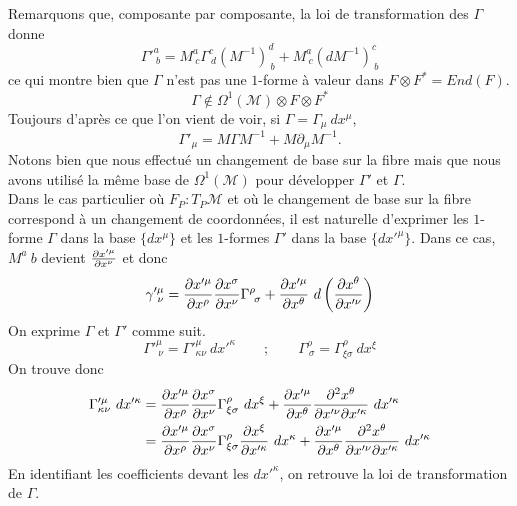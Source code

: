 \documentclass[a4paper,11pt]{report}
\theoremstyle{definition}
\theoremstyle{plain}
\theoremstyle{definition}
\theoremstyle{remark}
\newcommand{\M}{\mathscr{M}}
\newcommand{\p}{\partial}
\begin{document}
            Remarquons que, composante par composante, la loi de transformation des $\Gamma$ donne 
            \begin{equation}
                \Gamma'^{a}_{~b} = M^a_{~c}\Gamma^c_{~d}(M^{-1})^d_{~b}+M^a_{~c}(dM^{-1})^c_{~b}
            \end{equation}
            ce qui montre bien que $\Gamma$ n'est pas une $1$-forme à valeur dans $F\otimes F^* = End(F)$.
            \begin{equation}
                \Gamma\notin \Omega^1(\M)\otimes F \otimes F^*
            \end{equation}
            Toujours d'après ce que l'on vient de voir, si $\Gamma = \Gamma_\mu~dx^\mu$,
            \begin{equation}
                \Gamma'_{\mu} = M\Gamma M^{-1} + M\p_\mu M^{-1}.
            \end{equation}
            Notons bien que nous effectué un changement de base sur la fibre mais que nous avons utilisé la même base de $\Omega^1(\M)$ pour développer $\Gamma'$ et $\Gamma$.\\
            
            Dans le cas particulier où $F_P : T_P\M$ et où le changement de base sur la fibre correspond à un changement de coordonnées, il est naturelle d'exprimer les $1$-forme $\Gamma$ dans la base $\{dx^\mu\}$ et les $1$-formes $\Gamma'$ dans la base $\{dx'^\mu\}$. Dans ce cas, $M^a{~b}$ devient $\pdv{x'^\mu}{x^\nu}$ et donc 
            \begin{equation}
                \gamma'^\mu_{~\nu} = \pdv{x'^\mu}{x^\rho}\pdv{x^\sigma}{x^\nu}\Gamma^\rho_{~\sigma} + \pdv{x'^\mu}{x^\theta}~d\left( \pdv{x^\theta}{x'^\nu} \right)
            \end{equation}
            On exprime $\Gamma$ et $\Gamma'$ comme suit.
            \begin{equation}
                \Gamma'^\mu_{~\nu} =  \Gamma'^\mu_{\kappa\nu}~dx'^\kappa \qquad ; \qquad  \Gamma^\rho_{~\sigma} =  \Gamma^\rho_{\xi\sigma}~dx^\xi
            \end{equation}
            On trouve donc 
            \begin{align}
                \Gamma'^\mu_{\kappa\nu}~dx'^\kappa &= \pdv{x'^\mu}{x^\rho}\pdv{x^\sigma}{x^\nu} \Gamma^\rho_{\xi\sigma}~dx^\xi + \pdv{x'^\mu}{x^\theta}\pdv{x^\theta}{x'^\nu}{x'^\kappa}~dx'^\kappa\\
                &= \pdv{x'^\mu}{x^\rho}\pdv{x^\sigma}{x^\nu} \Gamma^\rho_{\xi\sigma}\pdv{x^\xi}{x'^\kappa}~dx^\kappa + \pdv{x'^\mu}{x^\theta}\pdv{x^\theta}{x'^\nu}{x'^\kappa}~dx'^\kappa
            \end{align}
            En identifiant les coefficients devant les $dx'^\kappa$, on retrouve la loi de transformation de $\Gamma$.
            
\end{document}
